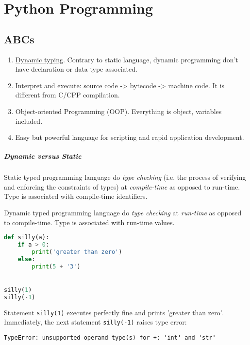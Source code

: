 \chapter{Python Programming}
\label{cha:python-programming}

\section{ABCs}
\label{sec:py-abcs}

\begin{enumerate}
\item \href{https://stackoverflow.com/a/1520342}{Dynamic
    typing}. Contrary to static language, dynamic programming
  don't have declaration or data type associated.
\item Interpret and execute: source code -> bytecode -> machine
  code. It is different from C/CPP compilation.
\item Object-oriented Programming (OOP). Everything is object,
  variables included.
\item Easy but powerful language for scripting and rapid
  application development.
\end{enumerate}

\paragraph{Dynamic versus Static}

Static typed programming language do \textit{type checking}
(i.e. the process of verifying and enforcing the constraints of
types) at \textit{compile-time} as opposed to run-time. Type is
associated with compile-time identifiers.

Dynamic typed programming language do \textit{type checking} at
\textit{run-time} as opposed to compile-time. Type is associated
with run-time values.

\begin{lstlisting}[language=python,caption={Python Type Checking},label={lst:py-type-checking}]
def silly(a):
    if a > 0:
        print('greater than zero')
    else:
        print(5 + '3')


silly(1)
silly(-1)
\end{lstlisting}

Statement \verb|silly(1)| executes perfectly fine and prints
'greater than zero'. Immediately, the next statement
\verb|silly(-1)| raises type error:

\begin{lstlisting}
TypeError: unsupported operand type(s) for +: 'int' and 'str'
\end{lstlisting}

